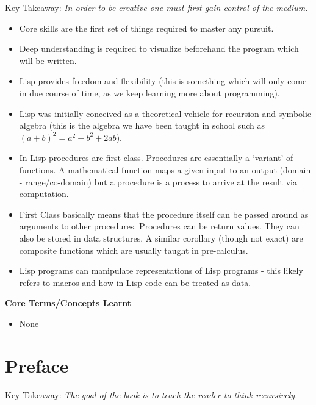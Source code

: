 \documentclass[11pt]{article}
\begin{document}
\vspace{1em}

Key Takeaway:
\emph{In order to be creative one must first gain control of the medium.}

\vspace{1em}

\begin{itemize}
\item Core skills are the first set of things required to master any pursuit.
\item Deep understanding is required to visualize beforehand the program which will be written.
\item Lisp provides freedom and flexibility (this is something which will only come in due course of time, as we keep
learning more about programming).
\item Lisp was initially conceived as a theoretical vehicle for recursion and symbolic algebra (this is the algebra we
have been taught in school such as \((a + b)^2 = a^2 + b^2 + 2ab\)).
\item In Lisp procedures are first class. Procedures are essentially a `variant' of functions. A mathematical function
maps a given input to an output (domain - range/co-domain) but a procedure is a process to arrive at the result via
computation.
\item First Class basically means that the procedure itself can be passed around as arguments to other procedures.
Procedures can be return values. They can also be stored in data structures. A similar corollary (though not exact)
are composite functions which are usually taught in pre-calculus.
\item Lisp programs can manipulate representations of Lisp programs - this likely refers to macros and how in Lisp code
can be treated as data.
\end{itemize}

\vspace{1em}

\textbf{Core Terms/Concepts Learnt}
\begin{itemize}
\item None
\end{itemize}

\newpage
\section{Preface}
\label{sec:org0b0861e}

Key Takeaway:
\emph{The goal of the book is to teach the reader to think recursively.}
\end{document}
